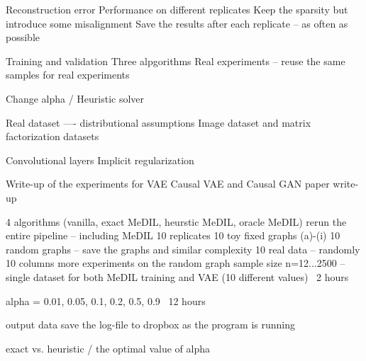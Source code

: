 Reconstruction error
Performance on different replicates
Keep the sparsity but introduce some misalignment
Save the results after each replicate -- as often as possible

Training and validation
Three alpgorithms
Real experiments -- reuse the same samples for real experiments

Change alpha / Heuristic solver

Real dataset —- distributional assumptions
Image dataset and matrix factorization datasets

Convolutional layers
Implicit regularization

Write-up of the experiments for VAE
Causal VAE and Causal GAN paper write-up


4 algorithms (vanilla, exact MeDIL, heurstic MeDIL, oracle MeDIL)
rerun the entire pipeline -- including MeDIL 10 replicates
10 toy fixed graphs (a)-(i)
10 random graphs -- save the graphs and similar complexity
10 real data -- randomly 10 columns
more experiments on the random graph
sample size n=12...2500 -- single dataset for both MeDIL training and VAE (10 different values)
~2 hours

alpha = 0.01, 0.05, 0.1, 0.2, 0.5, 0.9
~12 hours

output data
save the log-file to dropbox as the program is running

exact vs. heuristic / the optimal value of alpha

